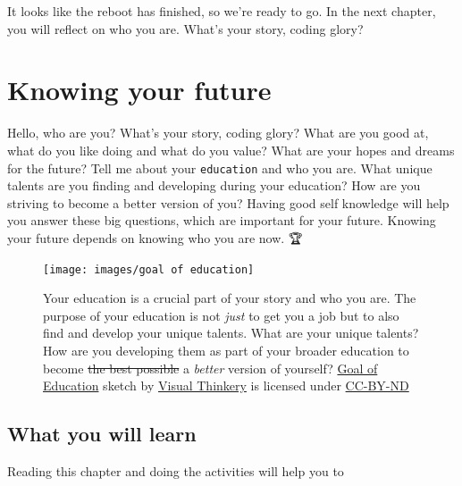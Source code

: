 \documentclass[
]{book}
\begin{document}
It looks like the reboot has finished, so we're ready to go. In the next chapter, you will reflect on who you are. What's your story, coding glory?

\hypertarget{knowing}{%
\chapter{Knowing your future}\label{knowing}}

Hello, who are you? What's your story, coding glory? What are you good at, what do you like doing and what do you value? What are your hopes and dreams for the future? Tell me about your \texttt{education} and who you are. What unique talents are you finding and developing during your education? How are you striving to become a better version of you? Having good self knowledge will help you answer these big questions, which are important for your future. Knowing your future depends on knowing who you are now. 🏆

\begin{figure}

{\centering \texttt{[image: images/goal of education]} 

}

\caption{Your education is a crucial part of your story and who you are. The purpose of your education is not \emph{just} to get you a job but to also find and develop your unique talents. What are your unique talents? How are you developing them as part of your broader education to become \sout{the best possible} a \emph{better} version of yourself? \href{https://www.flickr.com/photos/122135325@N06/16627558943/}{Goal of Education} sketch by \href{https://visualthinkery.com/}{Visual Thinkery} is licensed under \href{https://creativecommons.org/licenses/by-nd/4.0/}{CC-BY-ND}}\label{fig:goal-fig}
\end{figure}



\hypertarget{ilo2}{%
\section{What you will learn}\label{ilo2}}

Reading this chapter and doing the activities will help you to
\end{document}
